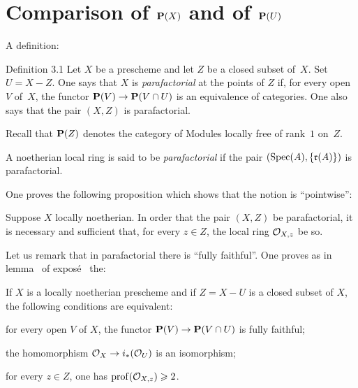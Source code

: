 \section{Comparison of ${\mathbf P}(X)$ and of ${\mathbf P}(U)$} \label{XI.3}

A definition:
\label{XI.3.1}
\begin{enonce*}[remark]{Definition 3.1\sfootnotemark}
Let $X$ be a prescheme and let $Z$ be a closed subset of~$X$. Set $U=X-Z$. One says that $X$ is \emph{parafactorial} at the points of $Z$ if, for every open $V$ of~$X$, the functor $\PP(V)\to \PP(V\cap U)$ is an equivalence of categories. One also says that the pair $(X, Z)$ is parafactorial.
\end{enonce*}

Recall that ${\mathbf P}(Z)$ denotes the category of Modules locally free of rank~$1$ on~$Z$.

\begin{definition} \label{XI.3.2}
A noetherian local ring is said to be \emph{parafactorial} if the pair $(\operatorname{Spec}(A), \{\mathfrak{r}(A)\})$ is parafactorial.
\end{definition}

One proves the following proposition which shows that the notion is ``pointwise'':

\begin{proposition} \label{XI.3.3}
Suppose $X$ locally noetherian. In order that the pair $(X, Z)$ be parafactorial, it is necessary and sufficient that, for every $z\in Z$, the local ring ${\mathcal O}_{X, z}$ be so.
\end{proposition}

Let us remark that in parafactorial there is ``fully faithful''. One proves as in lemma~ of expos\'e~ the:

\begin{lemma} \label{XI.3.4}
If $X$ is a locally noetherian prescheme and if $Z=X-U$ is a closed subset of $X$, the following conditions are equivalent:
\begin{enumeratei}
\item
for every open $V$ of $X$, the functor $\PP(V)\to \PP(V\cap U)$ is fully faithful;
\item
the homomorphism $\OX \to i_*(\Oo_U)$ is an isomorphism;
\item
for every $z\in Z$, one has $\operatorname{prof}({\mathcal O}_{X, z})\geqslant 2$.
\end{enumeratei}
\end{lemma}

